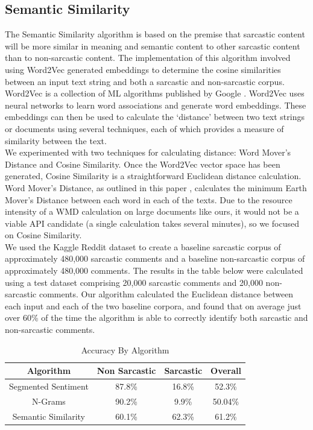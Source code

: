 \documentclass[conference]{IEEEtran}
\begin{document}
\subsection{Semantic Similarity}
The Semantic Similarity algorithm is based on the premise that sarcastic content will be more similar in meaning and semantic content to other sarcastic content than to non-sarcastic content.  The implementation of this algorithm involved using Word2Vec generated embeddings to determine the cosine similarities between an input text string and both a sarcastic and non-sarcastic corpus.  Word2Vec is a collection of ML algorithms published by Google \cite{b6}. Word2Vec uses neural networks to learn word associations and generate word embeddings.  These embeddings can then be used to calculate the ‘distance’ between two text strings or documents using several techniques, each of which provides a measure of similarity between the text.  \\
We experimented with two techniques for calculating distance: Word Mover’s Distance and Cosine Similarity.  Once the Word2Vec vector space has been generated, Cosine Similarity is a straightforward Euclidean distance calculation.  Word Mover’s Distance, as outlined in this paper \cite{b7}, calculates the minimum Earth Mover’s Distance between each word in each of the texts.  Due to the resource intensity of a WMD calculation on large documents like ours, it would not be a viable API candidate (a single calculation takes several minutes), so we focused on Cosine Similarity.  \\ 
We used the Kaggle Reddit dataset to create a baseline sarcastic corpus of approximately 480,000 sarcastic comments and a baseline non-sarcastic corpus of approximately 480,000 comments.  The results in the table below were calculated using a test dataset comprising 20,000 sarcastic comments and 20,000 non-sarcastic comments.  Our algorithm calculated the Euclidean distance between each input and each of the two baseline corpora, and found that on average just over 60\% of the time the algorithm is able to correctly identify both sarcastic and non-sarcastic comments.\\

\begin{table}[htbp]
\caption{Accuracy By Algorithm}
\begin{center}
 \begin{tabular}{| c || c | c | c | } 
 \hline
Algorithm & Non Sarcastic & Sarcastic & Overall  \\ 
 \hline\hline
Segmented Sentiment& 87.8\% & 16.8\%  & 52.3\%   \\ 
 \hline
N-Grams& 90.2\%  & 9.9\%  & 50.04\%    \\[1ex] 
 \hline
Semantic Similarity& 60.1\%  & 62.3\%  & 61.2\%      \\[1ex] 
 \hline
\end{tabular}
\end{center}
\end{table}
\end{document}
